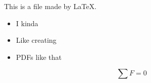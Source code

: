 \documentclass{article}
\begin{document}
    This is a file made by \LaTeX.
    \begin{itemize}
        \item I kinda 
        \item Like creating
        \item PDFs like that
    \end{itemize}

    \begin{equation}
        \sum F = 0
    \end{equation}

\end{document}
